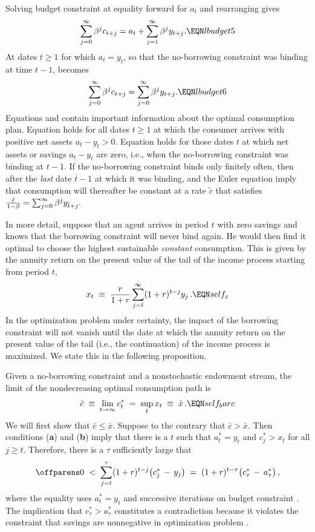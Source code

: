 Solving 
budget constraint  at equality
forward for $a_t$ and rearranging gives
$$ \sum_{j=0}^\infty \beta^j c_{t+j} = a_t + \sum_{j=1}^\infty
  \beta^j y_{t+j}.   \EQN lbudget5 $$
At dates $t\geq 1$ for which $a_t = y_t$,  so that the no-borrowing constraint
was binding at time $t-1$,   becomes
$$\sum_{j=0}^\infty \beta^j c_{t+j} = \sum_{j=0}^\infty \beta^j y_{t+j}.
\EQN lbudget6 $$
Equations  and  contain important information
about the  optimal consumption plan.
Equation  holds for all dates  $t \geq 1$  at which
the consumer arrives
with positive net assets $a_t - y_t >0$.  Equation
 holds for those dates $t$ at which net assets
or savings
$a_t - y_t$
are zero, i.e., when the no-borrowing constraint was
binding at $t-1$.   If the no-borrowing constraint  binds
only finitely often, then after the {\it last\/} date $\overline t -1$
at which it was binding,  and the Euler equation
 imply that consumption will thereafter be constant
at a rate $\tilde c$ that satisfies
${\tilde c \over 1 -\beta } = \sum_{j=0}^\infty \beta^j
y_{{\overline t}+j}.$

In more detail,
suppose that an agent arrives in period $t$ with zero savings and
knows that the borrowing constraint will never bind again. He
would then find it optimal to choose the highest sustainable
{\it constant\/} consumption.  This is given by the annuity return on
the present value of the tail of the income process starting from period $t$,
$$
x_t\;\equiv\; {r \over 1+r} \sum_{j=t}^\infty (1+r)^{t-j} y_{j}\,.
\EQN self_x $$
In the optimization problem under certainty, the
impact of the borrowing
constraint will not vanish until the date at which
the annuity return on  the present value of the tail (i.e., the continuation) of the
income process is maximized. We state this in the following proposition.

\medskip
{} Given a no-borrowing constraint and a nonstochastic
endowment stream, the limit of
the nondecreasing optimal consumption path is
$$
\bar c \;\equiv\; \lim_{t \rightarrow \infty} c^*_t
\;=\; \sup_t x_t \;\equiv\;\bar x \,.              \EQN self_barc
$$
\medskip
{}
We will first show that $\bar c \leq \bar x$. Suppose to the contrary
that $\bar c > \bar x$. Then conditions ({\bf a}) and ({\bf b}) imply that
there is a $t$ such that $a^*_t=y_t$ and $c^*_{j}>x_t$ for all
$j\geq t$. Therefore, there is a $\tau$ sufficiently large that
$$
\offparens
0 \;<\; \sum_{j=t}^\tau (1+r)^{t-j}
\bigl(c^*_{j} \,-\, y_{j} \bigr) \;=\;
(1+r)^{t-\tau} \bigl( c^*_{\tau} \,-\, a^*_{\tau} \bigr)\,,
$$
\autoparens
where the equality uses $a^*_t=y_t$ and successive iterations on
budget constraint . The implication that
$c^*_{\tau} > a^*_{\tau}$
constitutes a contradiction because it violates the constraint that
savings are nonnegative in optimization problem .

